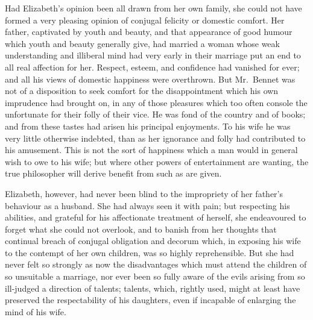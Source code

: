 \documentclass[12pt,english,oneside]{book}
\begin{document}
Had Elizabeth's opinion been all drawn from her own family, she could
not have formed a very pleasing opinion of conjugal felicity or domestic
comfort. Her father, captivated by youth and beauty, and that appearance
of good humour which youth and beauty generally give, had married
a woman whose weak understanding and illiberal mind had very early
in their marriage put an end to all real affection for her. Respect,
esteem, and confidence had vanished for ever; and all his views of
domestic happiness were overthrown. But Mr.\ Bennet was not of a
disposition to seek comfort for the disappointment which his own imprudence
had brought on, in any of those pleasures which too often console
the unfortunate for their folly of their vice. He was fond of the
country and of books; and from these tastes had arisen his principal
enjoyments. To his wife he was very little otherwise indebted, than
as her ignorance and folly had contributed to his amusement. This
is not the sort of happiness which a man would in general wish to
owe to his wife; but where other powers of entertainment are wanting,
the true philosopher will derive benefit from such as are given.

Elizabeth, however, had never been blind to the impropriety of her
father's behaviour as a husband. She had always seen it with pain;
but respecting his abilities, and grateful for his affectionate treatment
of herself, she endeavoured to forget what she could not overlook,
and to banish from her thoughts that continual breach of conjugal
obligation and decorum which, in exposing his wife to the contempt
of her own children, was so highly reprehensible. But she had never
felt so strongly as now the disadvantages which must attend the children
of so unsuitable a marriage, nor ever been so fully aware of the evils
arising from so ill-judged a direction of talents; talents, which,
rightly used, might at least have preserved the respectability of
his daughters, even if incapable of enlarging the mind of his wife.
\end{document}
